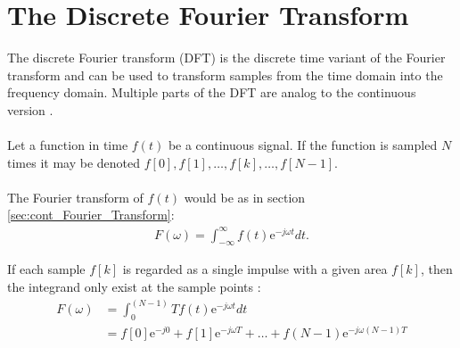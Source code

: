 \section{The Discrete Fourier Transform} \label{sec:DFT}
%
%
%
The discrete Fourier transform (DFT) is the discrete time variant of the Fourier transform and can be used to transform samples from the time domain into the frequency domain.
Multiple parts of the DFT are analog to the continuous version \cite{DFT_OX}.
\\ \\
Let a function in time $f(t)$ be a continuous signal.
If the function is sampled $N$ times it may be denoted
$f[0],f[1],\dots,f[k],\dots,f[N-1]$.
\\ \\
The Fourier transform of $f(t)$ would be as in section \ref{sec:cont_Fourier_Transform}:
\begin{align*}
	F(\omega) = \int_{-\infty}^\infty f(t)\text{e}^{-j\omega t} dt.
\end{align*}

If each sample $f[k]$ is regarded as a single impulse with a given area $f[k]$, then the integrand only exist at the sample points \cite{DFT_OX}:
\begin{align*}
	F(\omega) 
	&= \int_0^{(N-1)}T f(t) \text{e}^{-j\omega t}dt\\
	&= f[0]\text{e}^{-j0} + f[1]\text{e}^{-j\omega T} + \dots + 	f(N-1) \text{e}^{-j	\omega(N-1)T}	
\end{align*}

